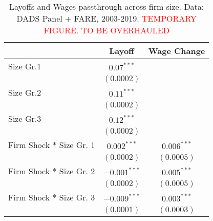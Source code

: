 \begin{table}
  \centering

  \label{tab:layoff response}
  \begin{tabular}{lcc}
    \hline
    & \multicolumn{1}{c}{Layoff} & \multicolumn{1}{c}{Wage Change} \\
    \hline
    \vspace{-4pt} 
    Size Gr.1        &  $0.07^{***}$   &      \\    \vspace{-4pt} 
                        &  $(0.0002)$     &       \\    \vspace{-4pt} 
    Size Gr.2        &  $0.11^{***}$       &        \\     \vspace{-4pt} 
                        &  $(0.0002)$     &         \\    \vspace{-4pt} 
    Size Gr.3        &  $0.12^{***}$       &        \\     \vspace{-4pt} 
                        &  $(0.0002)$     &         \\    \vspace{-4pt} 
    Firm Shock * Size Gr. 1        & $0.002^{***}$     &  $0.006^{***}$   \\ \vspace{-4pt}
                                &  $(0.0002)$     &    $(0.0005)$ \\    \vspace{-4pt} 
    Firm Shock * Size Gr. 2        & $-0.001^{***}$     & $0.005^{***}$  \\    \vspace{-4pt} 
                                &  $(0.0002)$     &    $(0.0005)$ \\    \vspace{-4pt} 
    Firm Shock * Size Gr. 3        & $-0.009^{***}$     &   $0.003^{***}$ \\    \vspace{-4pt} 
                                    &  $(0.0001)$     &    $(0.0003)$ \\  
    \hline
  \end{tabular}
  \caption{Layoffs and Wages passthrough across firm size. Data: DADS Panel + FARE, 2003-2019. \textcolor{red}{TEMPORARY FIGURE. TO BE OVERHAULED}}
\end{table}
